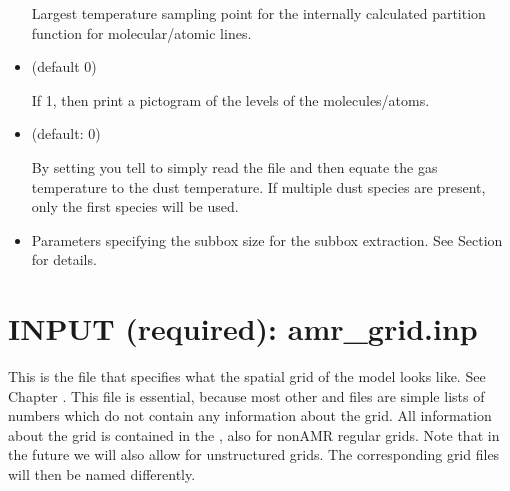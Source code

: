 \documentclass[letterpaper,10pt,english]{sphinxmanual}
\begin{document}
\begin{itemize}
Largest temperature sampling point for the internally calculated
partition function for molecular/atomic lines.

\item {} 
 (default 0)

If 1, then print a pictogram of the levels of the molecules/atoms.

\item {} 
 (default: 0)

By setting  you tell  to
simply read the  file and then equate
the gas temperature to the dust temperature. If multiple dust species
are present, only the first species will be used.

\item {} 

Parameters specifying the subbox size for the subbox extraction.
See Section {\hyperref[\detokenize{toolsinside:sec-subbox}]{}} for details.

\end{itemize}


\section{INPUT (required): amr\_grid.inp}
\label{\detokenize{inputoutputfiles:input-required-amr-grid-inp}}\label{\detokenize{inputoutputfiles:sec-grid-input}}
This is the file that specifies what the spatial grid of the model looks
like. See Chapter {\hyperref[\detokenize{gridding:chap-gridding}]{}}. This file is essential, because most
other  and  files are simple lists of numbers which do not
contain any information about the grid. All information about the grid is
contained in the , also for non\sphinxhyphen{}AMR regular grids. Note that
in the future we will also allow for unstructured grids. The corresponding grid
files will then be named differently.
\end{document}
